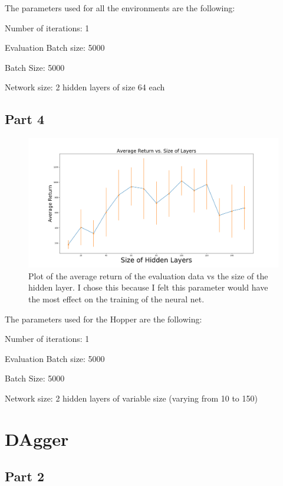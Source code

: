 \documentclass{article}
\begin{document}
The parameters used for all the environments are the following:

Number of iterations: 1

Evaluation Batch size: 5000

Batch Size: 5000

Network size: 2 hidden layers of size 64 each

\subsection{Part 4}

\begin{figure}[H]
  \centering
  \includegraphics[width=1\linewidth]{irl_ass1_1.3.png}
  \caption{Plot of the average return of the evaluation data vs the size of the hidden layer. I chose this because I felt this parameter would have the most effect on the training of the neural net.}
  \label{fig:1.3}
\end{figure}

The parameters used for the Hopper are the following:

Number of iterations: 1

Evaluation Batch size: 5000

Batch Size: 5000

Network size: 2 hidden layers of variable size (varying from 10 to 150)

\newpage

\section{DAgger}
\subsection{Part 2}
\end{document}
